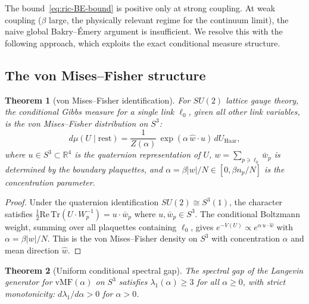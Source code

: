\documentclass[11pt]{article}
\newtheorem{theorem}{Theorem}[section]
\theoremstyle{definition}
\newcommand{\Tr}{\mathrm{Tr}}
\newcommand{\R}{\mathbb{R}}
\begin{document}
The bound~\eqref{eq:ric-BE-bound} is positive only at strong coupling. At weak coupling ($\beta$ large, the physically relevant regime for the continuum limit), the naive global Bakry--\'Emery argument is insufficient. We resolve this with the following approach, which exploits the exact conditional measure structure.

\subsection{The von Mises--Fisher structure}

\begin{theorem}[von Mises--Fisher identification]\label{thm:vmf}
For $SU(2)$ lattice gauge theory, the conditional Gibbs measure for a single link $\ell_0$, given all other link variables, is the von Mises--Fisher distribution on $S^3$:
\begin{equation}
    d\mu(U \mid \text{rest}) = \frac{1}{Z(\alpha)}\, \exp(\alpha\, \hat{w} \cdot u)\, dU_{\mathrm{Haar}},
\end{equation}
where $u \in S^3 \subset \R^4$ is the quaternion representation of $U$, $w = \sum_{p \ni \ell_0} \bar{w}_p$ is determined by the boundary plaquettes, and $\alpha = \beta|w|/N \in [0, \beta n_p/N]$ is the concentration parameter.
\end{theorem}

\begin{proof}
Under the quaternion identification $SU(2) \cong S^3(1)$, the character satisfies $\frac{1}{2}\mathrm{Re}\,\Tr(U \cdot W_p^{-1}) = u \cdot \bar{w}_p$ where $u, \bar{w}_p \in S^3$. The conditional Boltzmann weight, summing over all plaquettes containing $\ell_0$, gives $e^{-V(U)} \propto e^{\alpha\, u \cdot \hat{w}}$ with $\alpha = \beta|w|/N$. This is the von Mises--Fisher density on $S^3$ with concentration $\alpha$ and mean direction $\hat{w}$.
\end{proof}

\begin{theorem}[Uniform conditional spectral gap]\label{thm:uniform-gap}
The spectral gap of the Langevin generator for $\mathrm{vMF}(\alpha)$ on $S^3$ satisfies $\lambda_1(\alpha) \geq 3$ for all $\alpha \geq 0$, with strict monotonicity: $d\lambda_1/d\alpha > 0$ for $\alpha > 0$.
\end{theorem}
\end{document}
